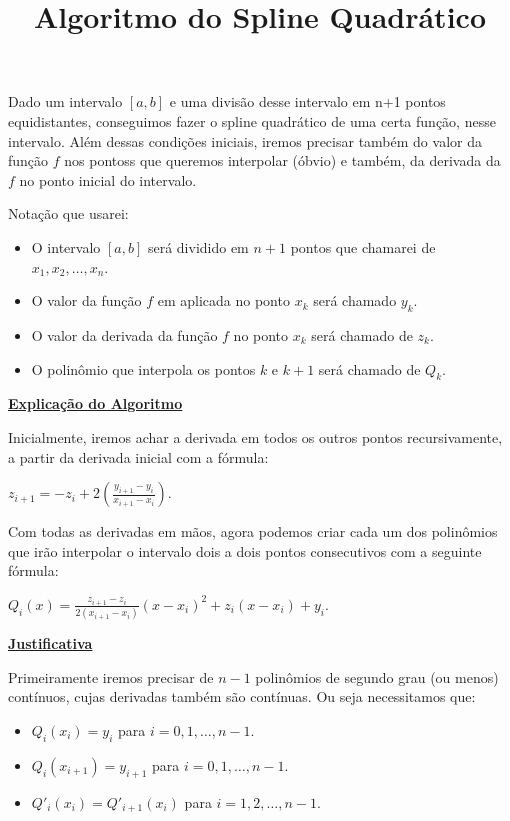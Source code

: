 \documentclass[12pt]{article}
\title{Algoritmo do Spline Quadrático}
\author{}
\date{}
\newcommand{\mytitle}[1]{\textbf{\underline{#1}}}
\begin{document}
\maketitle

Dado um intervalo $[a,b]$ e uma divisão desse intervalo em n+1 pontos equidistantes, conseguimos fazer o spline quadrático de uma certa função, nesse intervalo. Além dessas condições iniciais, iremos precisar também do valor da função $f$ nos pontoss que queremos interpolar (óbvio) e também, da derivada da $f$ no ponto inicial do intervalo.

Notação que usarei:

\begin{itemize}
  
\item O intervalo $[a,b]$ será dividido em $n+1$ pontos que chamarei de $x_1, x_2, \dots, x_n$.
  
\item O valor da função $f$ em aplicada no ponto $x_k$ será chamado $y_k$.
  
\item O valor da derivada da função $f$ no ponto $x_k$ será chamado de $z_k$.
  
\item O polinômio que interpola os pontos $k$ e $k+1$ será chamado de $Q_k$.
  
\end{itemize}

\mytitle{Explicação do Algoritmo}

Inicialmente, iremos achar a derivada em todos os outros pontos recursivamente, a partir da derivada inicial com a fórmula:

$z_{i+1} = -z_i + 2(\frac{y_{i+1}-y_i}{x_{i+1}-x_i})$.

Com todas as derivadas em mãos, agora podemos criar cada um dos polinômios que irão interpolar o intervalo dois a dois pontos consecutivos com a seguinte fórmula:

$Q_i(x) = \frac{z_{i+1}-z_{i}}{2(x_{i+1}-x_i)}(x-x_i)^2+z_i(x-x_i)+y_i$.

\mytitle{Justificativa}

Primeiramente iremos precisar de $n-1$ polinômios de segundo grau (ou menos) contínuos, cujas derivadas também são contínuas. Ou seja necessitamos que:

\begin{itemize}
  
\item $Q_i(x_i) = y_i$ para $i = 0, 1, \dots, n-1$.
  
\item $Q_i(x_{i+1}) = y_{i+1}$ para $i = 0, 1, \dots, n-1$.
  
\item $Q'_i(x_i) = Q'_{i+1}(x_i)$ para $i = 1, 2, \dots, n-1$.
  
\end{itemize}
\end{document}
